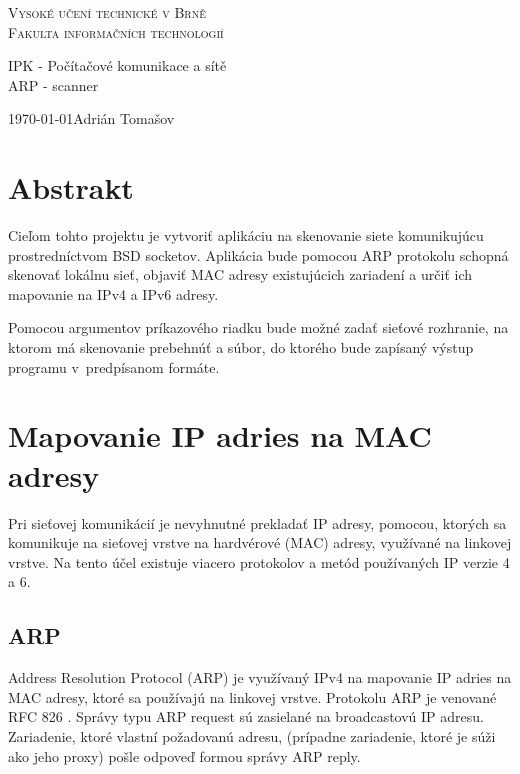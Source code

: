 \documentclass[a4paper, 11pt]{article}
\begin{document}
\begin{center}
\thispagestyle{empty}
\Huge
\textsc{Vysoké učení technické v Brně\\
\huge Fakulta informačních technologií\\}

\LARGE IPK - Počítačové komunikace a sítě\\
\Huge ARP - scanner
\end{center}
{\LARGE \today \hfill Adrián Tomašov}
\pagebreak

\tableofcontents
\pagebreak


\setcounter{page}{1}


\section{Abstrakt}
Cieľom tohto projektu je vytvoriť aplikáciu na skenovanie siete komunikujúcu prostredníctvom BSD socketov. Aplikácia bude pomocou ARP protokolu schopná skenovať lokálnu sieť, objaviť MAC adresy existujúcich zariadení a určiť ich mapovanie na IPv4 a IPv6 adresy. 

Pomocou argumentov príkazového riadku bude možné zadať sieťové rozhranie, na ktorom má skenovanie prebehnúť a súbor, do ktorého bude zapísaný výstup programu v~predpísanom formáte.

\section{Mapovanie IP adries na MAC adresy}
Pri sieťovej komunikácií je nevyhnutné prekladať IP adresy, pomocou, ktorých sa komunikuje na sieťovej vrstve na hardvérové (MAC) adresy, využívané na linkovej vrstve. Na tento účel existuje viacero protokolov a metód používaných IP verzie 4 a 6.

\subsection{ARP}
Address Resolution Protocol (ARP) je využívaný IPv4 na mapovanie IP adries na MAC adresy, ktoré sa používajú na linkovej vrstve. Protokolu ARP je venované RFC 826 \cite{arp}. Správy typu ARP request sú zasielané na broadcastovú IP adresu. Zariadenie, ktoré vlastní požadovanú adresu, (prípadne zariadenie, ktoré je súži ako jeho proxy) pošle odpoveď formou správy ARP reply.
\end{document}
